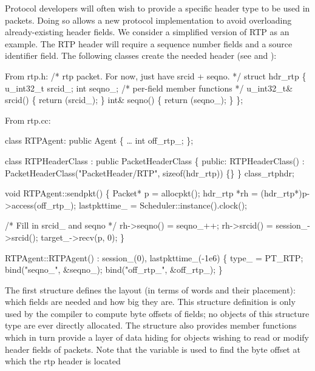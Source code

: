 Protocol developers
will often wish to provide a specific header type to be used in packets.
Doing so allows a new protocol implementation
to avoid overloading already-existing header fields.
We consider a simplified version of RTP as an example.
The RTP header will require a sequence number fields and a source
identifier field.
The following classes create the needed header
(see  and ):
\begin{program}
{\rm From rtp.h:}
        /* {\cf rtp packet.  For now, just have srcid + seqno.} */
        struct hdr_rtp \{ 
                u_int32_t srcid_;
                int seqno_;
                /* {\cf per-field member functions } */
                u_int32_t& srcid() \{ return (srcid_); \}
                int& seqno() \{ return (seqno_); \}
        \};

{\rm From rtp.cc:}

        class RTPAgent: public Agent \{
                \ldots
                int off_rtp_;
        \};

        class RTPHeaderClass : public PacketHeaderClass \{
        public: 
                RTPHeaderClass() : PacketHeaderClass("PacketHeader/RTP",
                                                     sizeof(hdr_rtp)) \{\}
        \} class_rtphdr;

        void RTPAgent::sendpkt()
        \{
                Packet* p = allocpkt();
                hdr_rtp *rh = (hdr_rtp*)p->access(off_rtp_);
                lastpkttime_ = Scheduler::instance().clock();

                /* {\cf Fill in srcid_ and seqno} */
                rh->seqno() = seqno_++;
                rh->srcid() = session_->srcid();
                target_->recv(p, 0);
        \}

        RTPAgent::RTPAgent()
                : session_(0), lastpkttime_(-1e6)
        \{
                type_ = PT_RTP;
                bind("seqno_", &seqno_);
                bind("off_rtp_", &off_rtp_);
        \}
\end{program}
The first structure defines the layout
(in terms of words and their placement):
which fields are needed and how big they are.
This structure definition is only used by the
compiler to compute byte offsets of fields;
no objects of this structure type are ever directly allocated.
The structure also provides member functions which in turn
provide a layer of data hiding for objects wishing to read
or modify header fields of packets.
Note that the variable  is used
to find the byte offset at which the rtp header is located
